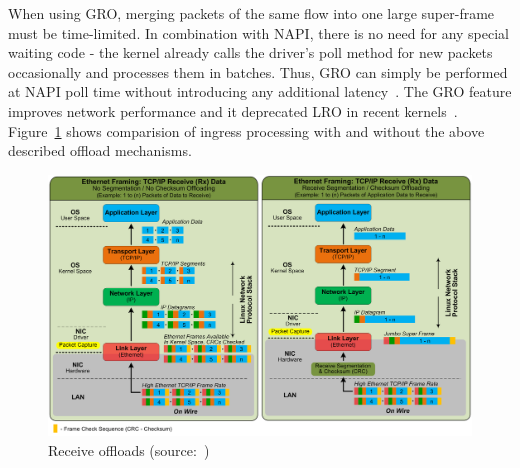 When using GRO, merging packets of the same flow into one large super-frame must be time-limited.
In combination with NAPI, there is no need for any special waiting code -
the kernel already calls the driver's poll method for new packets occasionally and processes them in batches.
Thus, GRO can simply be performed at NAPI poll time without introducing any additional latency~\cite{jls2009-gro}.
The GRO feature improves network performance
and it deprecated LRO in recent kernels~\cite{linux-kernel-networking}.
Figure~\ref{fig:linux-rcv-offloads} shows comparision of ingress processing
with and without the above described offload mechanisms.
\begin{figure}
	\centering
	\includegraphics[width=15cm,keepaspectratio]{fig/rcv-offloads.png}
	\caption{Receive offloads (source:~\cite{nst-offloads})}
	\label{fig:linux-rcv-offloads}
	\bigskip
\end{figure}
